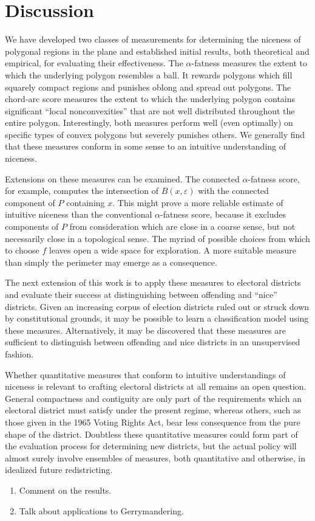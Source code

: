 \documentclass[]{jocg}
\theoremstyle{definition}
\theoremstyle{remark}
\begin{document}
\section{Discussion}

We have developed two classes of measurements for determining the niceness of
polygonal regions in the plane and established initial results, both theoretical
and empirical, for evaluating their effectiveness. The $\alpha$-fatness measures
the extent to which the underlying polygon resembles a ball. It rewards
polygons which fill squarely compact regions and punishes oblong and spread out
polygons. The chord-arc score measures the extent to which the underlying
polygon contains significant ``local nonconvexities'' that are not well
distributed throughout the entire polygon. Interestingly, both measures perform
well (even optimally) on specific types of convex polygons but severely punishes
others. We generally find that these measures conform in some sense to an
intuitive understanding of niceness.

Extensions on these measures can be examined. The connected $\alpha$-fatness
score, for example, computes the intersection of $B(x,\varepsilon)$ with the
connected component of $P$ containing $x$. This might prove a more reliable
estimate of intuitive niceness than the conventional $\alpha$-fatness score,
because it excludes components of $P$ from consideration which are close in a
coarse sense, but not necessarily close in a topological sense. The myriad of
possible choices from which to choose $f$ leaves open a wide space for
exploration. A more suitable measure than simply the perimeter may emerge as a
consequence.

The next extension of this work is to apply these measures to electoral
districts and evaluate their success at distinguishing between offending and
``nice'' districts. Given an increasing corpus of election districts ruled out
or struck down by constitutional grounds, it may be possible to learn a
classification model using these measures. Alternatively, it may be discovered
that these measures are sufficient to distinguish between offending and nice
districts in an unsupervised fashion.

Whether quantitative measures that conform to intuitive understandings of
niceness is relevant to crafting electoral districts at all remains an open
question. General compactness and contiguity are only part of the requirements
which an electoral district must satisfy under the present regime, whereas
others, such as those given in the 1965 Voting Rights Act, bear less consequence
from the pure shape of the district. Doubtless these quantitative measures could
form part of the evaluation process for determining new districts, but the
actual policy will almost surely involve ensembles of measures, both
quantitative and otherwise, in idealized future redistricting.

\begin{enumerate}
  \item Comment on the results.
  \item Talk about applications to Gerrymandering.
\end{enumerate}

\medskip

\printbibliography[heading=bibintoc]
\end{document}
